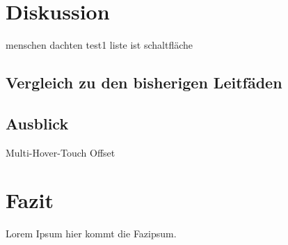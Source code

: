 \documentclass[a4paper,BCOR2mm,12pt,bibliography=totoc,listof=totoc,abstracton]{scrreprt}
\begin{document}
\chapter{Diskussion}
menschen dachten test1 liste ist schaltfläche

\section{Vergleich zu den bisherigen Leitfäden}


\section{Ausblick}
Multi-Hover-Touch
Offset

\chapter{Fazit}
Lorem Ipsum hier kommt die Fazipsum.
\end{document}
